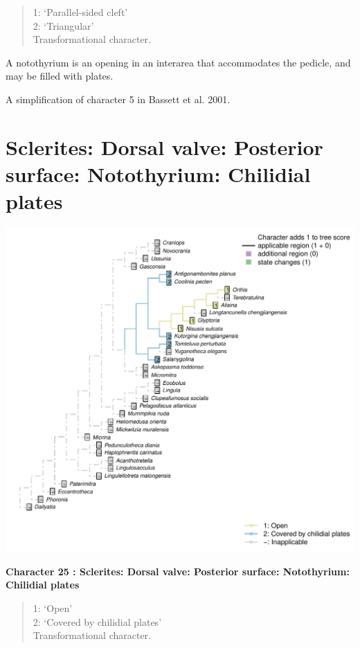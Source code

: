 \documentclass[]{book}
\theoremstyle{definition}
\theoremstyle{definition}
\theoremstyle{definition}
\theoremstyle{remark}
\begin{document}
\begin{quote}
1: `Parallel-sided cleft'\\
2: `Triangular'\\
Transformational character.
\end{quote}

A notothyrium is an opening in an interarea that accommodates the
pedicle, and may be filled with plates.

A simplification of character 5 in Bassett et al. 2001.

\hypertarget{sclerites-dorsal-valve-posterior-surface-notothyrium-chilidial-plates}{%
\section*{Sclerites: Dorsal valve: Posterior surface: Notothyrium:
Chilidial
plates}\label{sclerites-dorsal-valve-posterior-surface-notothyrium-chilidial-plates}}

\includegraphics{Brachiopod_phylogeny_files/figure-latex/unnamed-chunk-5-25.pdf}

\textbf{Character 25 : Sclerites: Dorsal valve: Posterior surface:
Notothyrium: Chilidial plates }

\begin{quote}
1: `Open'\\
2: `Covered by chilidial plates'\\
Transformational character.
\end{quote}
\end{document}
